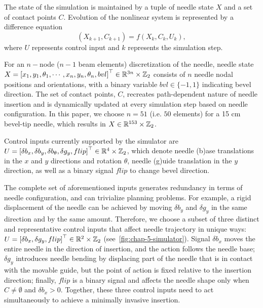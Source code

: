 The state of the simulation is maintained by a tuple of needle state $X$ and a set of contact points $C$. Evolution of the nonlinear system is represented by a difference equation
\begin{equation}
  \label{eq:chap-5-difference-equation}
  \left( X_{k+1}, C_{k+1}\right) = f \left( X_k, C_k, U_k \right),
\end{equation}
where $U$ represents control input and $k$ represents the simulation step. 

For an $n-$node ($n-1$ beam elements) discretization of the needle, needle state $X = \left[ x_1, y_1, \theta_1, \cdots, x_n, y_n, \theta_n, bvl \right]^{\top} \in \mathbb{R}^{3n}\times \mathbb{Z}_2$ consists of $n$ needle nodal positions and orientations, with a binary variable $bvl \in \{-1, 1\}$ indicating bevel direction. The set of contact points, $C$, recreates path-dependent nature of needle insertion and is dynamically updated at every simulation step based on needle configuration. In this paper, we choose $n=51$ (i.e. $50$ elements) for a 15 cm bevel-tip needle, which results in $X \in \mathbb{R}^{153}\times \mathbb{Z}_2$.

Control inputs currently supported by the simulator are $U = \left[ \delta b_x, \delta b_y, \delta b_\theta, \delta g_y, flip \right]^{\top} \in \mathbb{R}^4\times \mathbb{Z}_2$, which denote needle (b)ase translations in the $x$ and $y$ directions and rotation $\theta$, needle (g)uide translation in the $y$ direction, as well as a binary signal $flip$ to change bevel direction.

The complete set of aforementioned inputs generates redundancy in terms of needle configuration, and can trivialize planning problems. For example, a rigid displacement of the needle can be achieved by moving $\delta b_y$ and $\delta g_y$ in the same direction and by the same amount. Therefore, we choose a subset of three distinct and representative control inputs that affect needle trajectory in unique ways: $U = \left[ \delta b_x, \delta g_y, flip \right]^{\top} \in \mathbb{R}^2\times \mathbb{Z}_2$ (see~\cref{fig:chap-5-simulator}). Signal $\delta b_x$ moves the entire needle in the direction of insertion, and the action follows the needle base; $\delta g_y$ introduces needle bending by displacing part of the needle that is in contact with the movable guide, but the point of action is fixed relative to the insertion direction; finally, $flip$ is a binary signal and affects the needle shape only when $C \neq \emptyset$ and $\delta b_x > 0$. Together, these three control inputs need to act simultaneously to achieve a minimally invasive insertion. 

